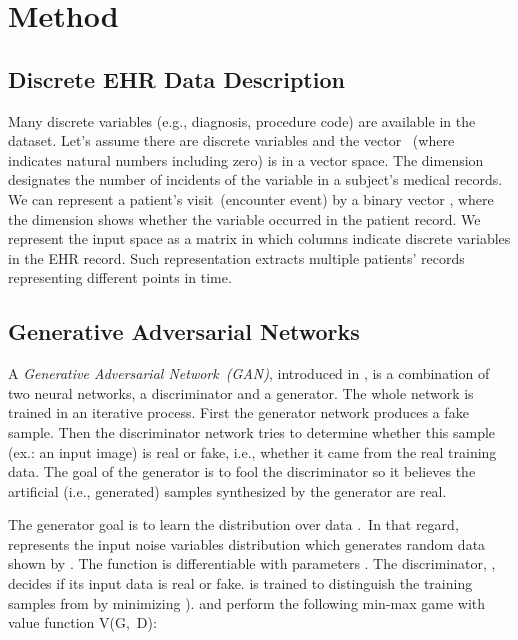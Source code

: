 \documentclass[letterpaper]{article} \usepackage{aaai20}  \usepackage{times}  \usepackage{helvet} \usepackage{courier}  \usepackage[hyphens]{url}  \usepackage{graphicx} \urlstyle{rm} \def\UrlFont{\rm}  \usepackage{graphicx}  \frenchspacing  \setlength{\pdfpagewidth}{8.5in}  \setlength{\pdfpageheight}{11in}
\begin{document}
\section{Method}\label{sec:Method}

\subsection{Discrete EHR Data Description}\label{sec:Methodsub:Data Description}

Many discrete variables (e.g., diagnosis, procedure code) are available in the dataset.
Let's assume there are  discrete variables and the vector ~(where  indicates natural numbers including zero) is in a vector space.
The  dimension designates the number of incidents of the  variable in a subject's medical records.
We can represent a patient's visit~(encounter event) by a binary vector , where the  dimension shows whether the  variable occurred in the patient record.
We represent the input space as a matrix in which columns indicate discrete variables in the EHR record. Such representation extracts multiple patients' records representing different points in time.


\subsection{Generative Adversarial Networks}\label{sec:Methodsub:Preliminary}

A \textit{Generative Adversarial Network~(GAN)}, introduced in \cite{goodfellow2014generative}, is a combination of two neural networks, a discriminator and a generator.
The whole network is trained in an iterative process.
First the generator network produces a fake sample.
Then the discriminator network tries to determine whether this sample (ex.: an input image) is real or fake, i.e., whether it came from the real training data.
The goal of the generator is to fool the discriminator so it believes the artificial (i.e., generated) samples synthesized by the generator are real.


The generator goal is to learn the distribution  over data .~In that regard,~ represents the input noise variables distribution which generates random data shown by .
The function  is differentiable with parameters .
The discriminator, , decides if its input data is real or fake.
 is trained to distinguish the training samples from  by minimizing ).
 and  perform the following min-max game with value function V(G,~D):
\end{document}
